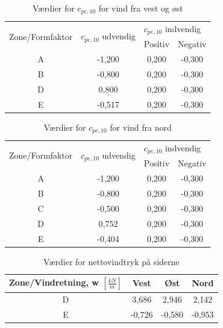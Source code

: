 \begin{table}[htb]
	\begin{center}
		\begin{tabular}{ |c|c|c|c| } 
			\hline
			\multirow{2}{*}{Zone/Formfaktor} & \multirow{2}{*}{$c_{pe,10}$ udvendig} & \multicolumn{2}{l|}{$c_{pe,10}$ indvendig} \\ \cline{3-4} 
			& & Positiv & Negativ   		\\ \hline
			A & -1,200 & 0,200 & -0,300 \\	\hline
			B & -0,800 & 0,200 & -0,300 \\	\hline 
			D & 0,800 & 0,200 & -0,300 \\	\hline
			E & -0,517 & 0,200 & -0,300 \\	\hline
		\end{tabular}
		\caption{Værdier for $c_{pe,10}$ for vind fra vest og øst}
		\label{tab:ff}
	\end{center}
\end{table}

\begin{table}[htb]
	\begin{center}
		\begin{tabular}{ |c|c|c|c| } 
			\hline
			\multirow{2}{*}{Zone/Formfaktor} & \multirow{2}{*}{$c_{pe,10}$ udvendig} & \multicolumn{2}{l|}{$c_{pe,10}$ indvendig} \\ \cline{3-4} 
			& & Positiv & Negativ   		\\ \hline
			A & -1,200 & 0,200 & -0,300 \\	\hline
			B & -0,800 & 0,200 & -0,300 \\	\hline
			C & -0,500 & 0,200 & -0,300 \\	\hline 
			D & 0,752 & 0,200 & -0,300 \\	\hline
			E & -0,404 & 0,200 & -0,300 \\	\hline
		\end{tabular}
		\caption{Værdier for $c_{pe,10}$ for vind fra nord}
		\label{tab:gg}
	\end{center}
\end{table}

\begin{table}[htb]
	\begin{center}
		\begin{tabular}{|c|c|c|c|}
			\hline
			Zone/Vindretning, w $[\frac{kN}{m}]$ & Vest & Øst & Nord \\ \hline
			D & 3,686 & 2,946 & 2,142 \\ \hline
			E & -0,726 & -0,580 & -0,953 \\ \hline
		\end{tabular}
		\caption{Værdier for nettovindtryk på siderne}
		\label{tab:hh}
	\end{center}
\end{table}

